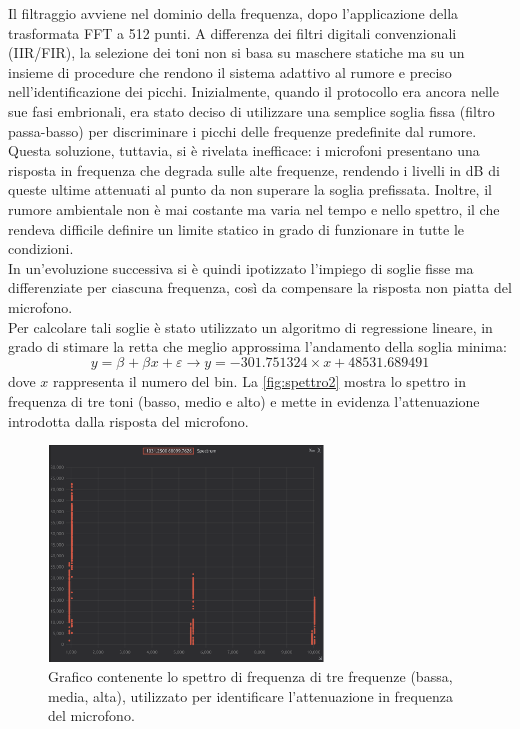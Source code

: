 Il filtraggio avviene nel dominio della frequenza, dopo l’applicazione della trasformata FFT a 512 punti.
 A differenza dei filtri digitali convenzionali (IIR/FIR), la selezione dei toni non si basa su maschere statiche ma su un insieme di procedure che rendono il sistema adattivo al rumore e preciso nell’identificazione dei picchi. 
 Inizialmente, quando il protocollo era ancora nelle sue fasi embrionali, era stato deciso di utilizzare una semplice soglia fissa (filtro passa-basso) per discriminare i picchi delle frequenze predefinite dal rumore. 
 Questa soluzione, tuttavia, si è rivelata inefficace: i microfoni presentano una risposta in frequenza che degrada sulle alte frequenze, rendendo i livelli in dB di queste ultime attenuati al punto da non superare la soglia prefissata. 
 Inoltre, il rumore ambientale non è mai costante ma varia nel tempo e nello spettro, il che rendeva difficile definire un limite statico in grado di funzionare in tutte le condizioni.\\

In un’evoluzione successiva si è quindi ipotizzato l’impiego di soglie fisse ma differenziate per ciascuna frequenza, così da compensare la risposta non piatta del microfono. \\
 Per calcolare tali soglie è stato utilizzato un algoritmo di regressione lineare, in grado di stimare la retta che meglio approssima l’andamento della soglia minima:
\[
y = \beta_{} + \beta_{}x + \varepsilon \rightarrow y = -301.751324 \times x + 48531.689491
\]
dove $x$ rappresenta il numero del bin. La \autoref{fig:spettro2} mostra lo spettro in frequenza di tre toni (basso, medio e alto) e mette in evidenza l’attenuazione introdotta dalla risposta del microfono.
\begin{figure}[H]
    \centering
    \includegraphics[width=0.65\textwidth]{immagini/fft_regression_check.png}
    \caption{Grafico contenente lo spettro di frequenza di tre frequenze (bassa, media, alta), utilizzato per identificare l'attenuazione in frequenza del microfono.}
    \label{fig:spettro2}
\end{figure}

